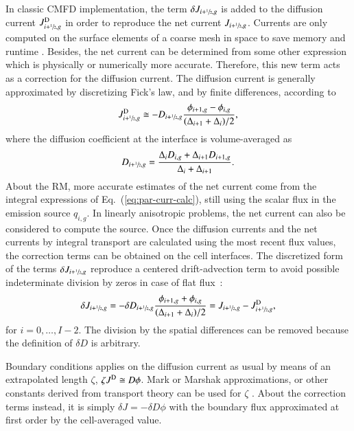 \documentclass[review,3p,onecolumn,sort&compress]{elsarticle}
\newcommand{\eq}[1]{Eq.~(\ref{#1})}
\newcommand{\jD}{\ensuremath{J^{\textrm{\scriptsize{D}}}}}
\newcommand{\hzi}{\ensuremath{\sfrac{1}{2}}}
\begin{document}
In classic CMFD implementation, the term $\delta J_{i+\hzi,g}$ is added to the diffusion current $\jD_{i+\hzi,g}$ in order to reproduce the net current $J_{i+\hzi,g}$. Currents are only computed on the surface elements of a coarse mesh in space to save memory and runtime \cite{Smith-1983}. Besides, the net current can be determined from some other expression which is physically or numerically more accurate. Therefore, this new term acts as a correction for the diffusion current. The diffusion current is generally approximated by discretizing Fick's law, and by finite differences, according to 
\begin{equation}
\label{eq:JD}
\jD_{i+\hzi,g} \cong - D_{i+\hzi,g}
\frac{\phi_{i+1,g} - \phi_{i,g}}{(\Delta_{i+1} + \Delta_i)/2},
\end{equation}
where the diffusion coefficient at the interface is volume-averaged as
\begin{equation}
\label{eq:Ds}
D_{i+\hzi,g} = \frac{\Delta_i D_{i,g} + \Delta_{i+1} D_{i+1,g}}
{\Delta_i + \Delta_{i+1}}.
\end{equation}
%
About the RM, more accurate estimates of the net current come from the integral expressions of \eq{eq:par-curr-calc}, still using the scalar flux in the emission source $q_{i,g}$. In linearly anisotropic problems, the net current can also be considered to compute the source. Once the diffusion currents and the net currents by integral transport are calculated using the most recent flux values, the correction terms can be obtained on the cell interfaces. The discretized form of the terms $\delta J_{i+\hzi,g}$ reproduce a centered drift-advection term to avoid possible indeterminate division by zeros in case of flat flux~\cite{Smith-1983,Tomatis-2011}:
\begin{equation}
\label{eq:dJ}
\delta J_{i+\hzi,g} = -\delta D_{i+\hzi,g}
\frac{\phi_{i+1,g} + \phi_{i,g}}{(\Delta_{i+1} + \Delta_i)/2} =
J_{i+\hzi,g} - \jD_{i+\hzi,g},
\end{equation}
for $i = 0, \ldots, I-2$. The division by the spatial differences can be removed because the definition of $\delta D$ is arbitrary.

Boundary conditions applies on the diffusion current as usual by means of an extrapolated length $\zeta$, $\zeta \jD \cong D \phi$. Mark or Marshak approximations, or other constants derived from transport theory can be used for $\zeta$ \cite{meghreblian1960reactor}. About the correction terms instead, it is simply $\delta J = -\delta D \phi$ with the boundary flux approximated at first order by the cell-averaged value.
\end{document}
